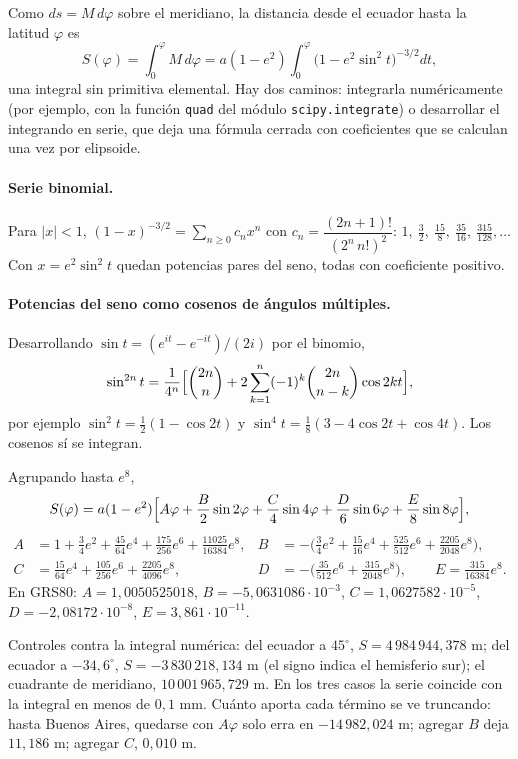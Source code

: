 Como \(ds=M\,d\varphi\) sobre el meridiano, la distancia desde el ecuador hasta la latitud
\(\varphi\) es
\[
  S(\varphi)=\int_0^{\varphi}M\,d\varphi=a(1-e^2)\int_0^{\varphi}\bigl(1-e^2\sin^2t\bigr)^{-3/2}dt ,
\]
una integral sin primitiva elemental. Hay dos caminos: integrarla numéricamente (por ejemplo,
con la función \texttt{quad} del módulo \texttt{scipy.integrate}) o desarrollar el integrando en serie, que deja una fórmula
cerrada con coeficientes que se calculan una vez por elipsoide.

\paragraph{Serie binomial.} Para \(|x|<1\),
\((1-x)^{-3/2}=\sum_{n\ge0}c_nx^n\) con
\(c_n=\dfrac{(2n+1)!}{(2^n\,n!)^2}\): \(1,\ \tfrac32,\ \tfrac{15}8,\ \tfrac{35}{16},\
\tfrac{315}{128},\dots\) Con \(x=e^2\sin^2t\) quedan potencias pares del seno, todas con
coeficiente positivo.

\paragraph{Potencias del seno como cosenos de ángulos múltiples.} Desarrollando
\(\sin t=(e^{it}-e^{-it})/(2i)\) por el binomio,
\[
  \sin^{2n}t=\frac1{4^n}\Bigl[\binom{2n}{n}+2\sum_{k=1}^{n}(-1)^k\binom{2n}{n-k}\cos2kt\Bigr],
\]
por ejemplo \(\sin^2t=\tfrac12(1-\cos2t)\) y \(\sin^4t=\tfrac18(3-4\cos2t+\cos4t)\). Los
cosenos sí se integran.

\begin{resultado}
Agrupando hasta \(e^8\),
\[
  S(\varphi)=a(1-e^2)\Bigl[A\varphi+\frac B2\sin2\varphi+\frac C4\sin4\varphi
  +\frac D6\sin6\varphi+\frac E8\sin8\varphi\Bigr],
\]
\[
\begin{aligned}
  A&=1+\tfrac34e^2+\tfrac{45}{64}e^4+\tfrac{175}{256}e^6+\tfrac{11025}{16384}e^8, &
  B&=-\bigl(\tfrac34e^2+\tfrac{15}{16}e^4+\tfrac{525}{512}e^6+\tfrac{2205}{2048}e^8\bigr),\\
  C&=\tfrac{15}{64}e^4+\tfrac{105}{256}e^6+\tfrac{2205}{4096}e^8, &
  D&=-\bigl(\tfrac{35}{512}e^6+\tfrac{315}{2048}e^8\bigr),\qquad
  E=\tfrac{315}{16384}e^8 .
\end{aligned}
\]
En GRS80: \(A=1{,}0050525018\), \(B=-5{,}0631086\cdot10^{-3}\),
\(C=1{,}0627582\cdot10^{-5}\), \(D=-2{,}08172\cdot10^{-8}\), \(E=3{,}861\cdot10^{-11}\).
\end{resultado}

Controles contra la integral numérica: del ecuador a \(45^\circ\),
\(S=4\,984\,944{,}378\) m; del ecuador a \(-34{,}6^\circ\), \(S=-3\,830\,218{,}134\) m (el signo
indica el hemisferio sur); el cuadrante de meridiano, \(10\,001\,965{,}729\) m. En los tres casos
la serie coincide con la integral en menos de \(0{,}1\) mm. Cuánto aporta cada término se ve
truncando: hasta Buenos Aires, quedarse con \(A\varphi\) solo erra en \(-14\,982{,}024\) m;
agregar \(B\) deja \(11{,}186\) m; agregar \(C\), \(0{,}010\) m.

